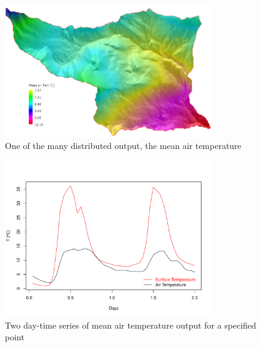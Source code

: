 \begin{figure}[h!]
\begin{center}
   \includegraphics[width=0.8\textwidth]{./images/pic_template/output_airT.png}
    \caption{One of the many distributed output, the mean air temperature} \label{airT}
\end{center}
\end{figure}
\begin{figure}[h!]
\begin{center}
   \includegraphics[width=0.8\textwidth]{./images/pic_template/tabs_airT.pdf}
    \caption{Two day-time series of mean air temperature output for a specified point} \label{tabs_airT}
\end{center}
\end{figure}






